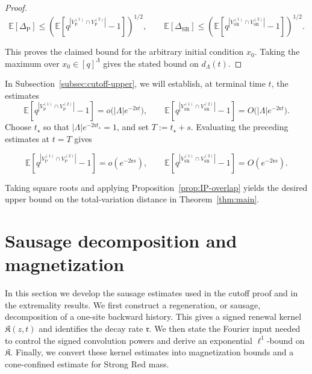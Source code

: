 \documentclass[letterpaper,11pt,reqno]{amsart}
\theoremstyle{definition}
\newcommand{\IK}{\mathfrak{K}}
\begin{document}
\begin{proof}
\[
\mathbb E[\Delta_{\mathrm{P}}]
\le
\left(
\mathbb E\left[
q^{|V_{\mathrm{P}}^{(1)}\cap V_{\mathrm{P}}^{(2)}|}-1
\right]
\right)^{1/2},
\qquad
\mathbb E[\Delta_{\mathrm{SR}}]
\le
\left(
\mathbb E\left[
q^{|V_{\mathrm{SR}}^{(1)}\cap V_{\mathrm{SR}}^{(2)}|}-1
\right]
\right)^{1/2}.
\]

This proves the claimed bound for the arbitrary initial condition \(x_0\).
Taking the maximum over \(x_0\in[q]^\Lambda\) gives the stated bound on
\(d_\Lambda(t)\).


\end{proof}



In Subsection~\ref{subsec:cutoff-upper}, we will establish, at terminal time $t$, the estimates
\[
\mathbb E\left[
q^{|V_{\mathrm{P}}^{(1)}\cap V_{\mathrm{P}}^{(2)}|}-1
\right]
=
o\bigl(|\Lambda|e^{-2\mathfrak{r}t}\bigr),
\qquad
\mathbb E\left[
q^{|V_{\mathrm{SR}}^{(1)}\cap V_{\mathrm{SR}}^{(2)}|}-1
\right]
=
O\bigl(|\Lambda|e^{-2\mathfrak{r}t}\bigr).
\]
Choose \(t_\star\) so that
\(|\Lambda|e^{-2\mathfrak{r}t_\star}=1\), and set \(T:=t_\star+s\). Evaluating
the preceding estimates at \(t=T\) gives


\[
\mathbb E\left[
q^{|V_{\mathrm{P}}^{(1)}\cap V_{\mathrm{P}}^{(2)}|}-1
\right]
=
o(e^{-2\mathfrak{r}s}),
\qquad
\mathbb E\left[
q^{|V_{\mathrm{SR}}^{(1)}\cap V_{\mathrm{SR}}^{(2)}|}-1
\right]
=
O(e^{-2\mathfrak{r}s}).
\]

Taking square roots and applying Proposition~\ref{prop:IP-overlap} yields the
desired upper bound on the total-variation distance in
Theorem~\ref{thm:main}.




\medskip



\section{Sausage decomposition and magnetization}\label{sec:sausage}

In this section we develop the sausage estimates used in the cutoff proof and in the extremality results. We first construct a regeneration, or sausage, decomposition of a one-site backward history. This gives a signed renewal kernel \(\IK(z,t)\) and identifies the decay rate $\mathfrak{r}$. We then state the Fourier input needed to control the signed convolution powers and derive an exponential \(\ell^1\)-bound on \(\IK\). Finally, we convert these kernel estimates into magnetization bounds and a cone-confined estimate for Strong Red mass.
\end{document}
